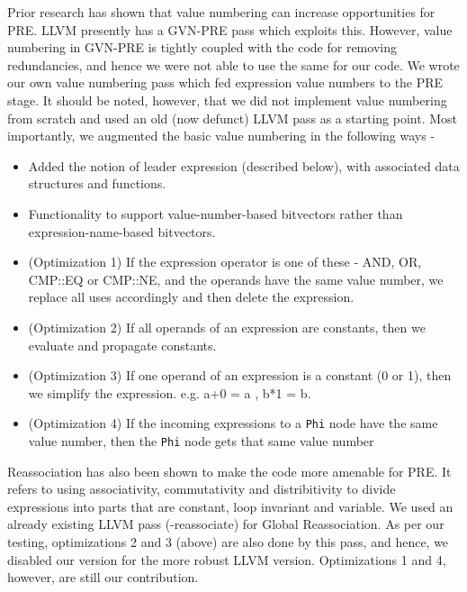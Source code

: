 \documentclass[10pt,twoside]{report}
\begin{document}
Prior research \cite{Briggs2} has shown that value numbering can increase opportunities for PRE.
LLVM presently has a GVN-PRE pass which exploits this. However, value numbering in 
GVN-PRE is tightly coupled with the code for removing redundancies, and hence
we were not able to use the same for our code. We wrote our own value numbering
pass which fed expression value numbers to the PRE stage. It should be noted,
however, that we did not implement value numbering from scratch and used an
old (now defunct) LLVM pass as a starting point. Most importantly, we
augmented the basic value numbering in the following ways - 
     
\begin{itemize}     
  \item Added the notion of leader expression (described below), with associated
  data structures and functions. 
  \item Functionality to support value-number-based bitvectors rather than
  expression-name-based bitvectors. 
  \item (Optimization 1) If the expression operator is one of these - AND, OR, CMP::EQ
  or CMP::NE, and the operands have the same value number, we replace all uses
  accordingly and then delete the expression.
  \item (Optimization 2) If all operands of an expression are constants, then we 
  evaluate and propagate constants. 
  \item (Optimization 3) If one operand of an expression is a constant (0 or 1), then 
  we simplify the expression. e.g. {a+0 = a} , {b*1 = b}.
  \item (Optimization 4) If the incoming expressions to a \texttt{Phi} node have the same value 
  number, then the \texttt{Phi} node gets that same value number
\end{itemize}  

  Reassociation has also been shown to make the code more amenable for PRE. It refers to 
using associativity, commutativity and distribitivity to divide expressions into parts that are
constant, loop invariant and variable. We used an already existing LLVM pass (-reassociate)
  for Global Reassociation. As per our testing, optimizations 2 and 3 (above) are also done by 
 this pass, and hence, we disabled our version for the more robust LLVM version. Optimizations 1 and 4, 
however, are still our contribution.
\end{document}
